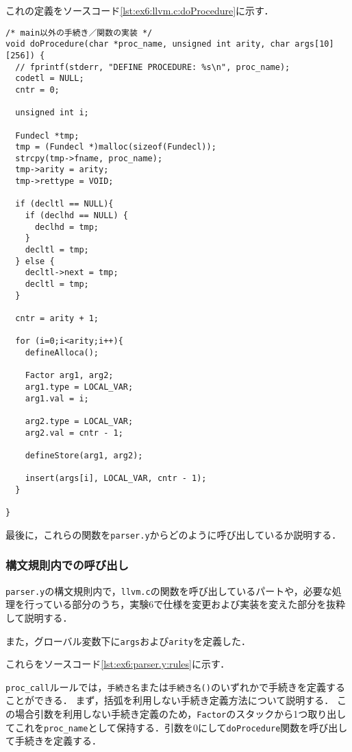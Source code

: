 \documentclass[uplatex]{jsarticle}
\begin{document}
これの定義をソースコード\ref{lst:ex6:llvm.c:doProcedure}に示す．

\begin{lstlisting}[caption=doMainProcedure関数の定義,label=lst:ex6:llvm.c:doProcedure]
/* main以外の手続き／関数の実装 */
void doProcedure(char *proc_name, unsigned int arity, char args[10][256]) {
  // fprintf(stderr, "DEFINE PROCEDURE: %s\n", proc_name);
  codetl = NULL;
  cntr = 0;

  unsigned int i;

  Fundecl *tmp;
  tmp = (Fundecl *)malloc(sizeof(Fundecl));
  strcpy(tmp->fname, proc_name);
  tmp->arity = arity;
  tmp->rettype = VOID;

  if (decltl == NULL){
    if (declhd == NULL) {
      declhd = tmp;
    }
    decltl = tmp;
  } else {
    decltl->next = tmp;
    decltl = tmp;
  }

  cntr = arity + 1;

  for (i=0;i<arity;i++){
    defineAlloca();

    Factor arg1, arg2;
    arg1.type = LOCAL_VAR;
    arg1.val = i;

    arg2.type = LOCAL_VAR;
    arg2.val = cntr - 1;

    defineStore(arg1, arg2);

    insert(args[i], LOCAL_VAR, cntr - 1);
  }

}
\end{lstlisting}

最後に，これらの関数を\verb#parser.y#からどのように呼び出しているか説明する．

\subsubsection{構文規則内での呼び出し}

\verb#parser.y#の構文規則内で，\verb#llvm.c#の関数を呼び出しているパートや，必要な処理を行っている部分のうち，実験6で仕様を変更および実装を変えた部分を抜粋して説明する．

また，グローバル変数下に\verb#args#および\verb#arity#を定義した．

これらをソースコード\ref{lst:ex6:parser.y:rules}に示す．

\verb#proc_call#ルールでは，\verb#手続き名#または\verb#手続き名()#のいずれかで手続きを定義することができる．
まず，括弧を利用しない手続き定義方法について説明する．
この場合引数を利用しない手続き定義のため，\verb#Factor#のスタックから1つ取り出してこれを\verb#proc_name#として保持する．引数を0にして\verb#doProcedure#関数を呼び出して手続きを定義する．
\end{document}
